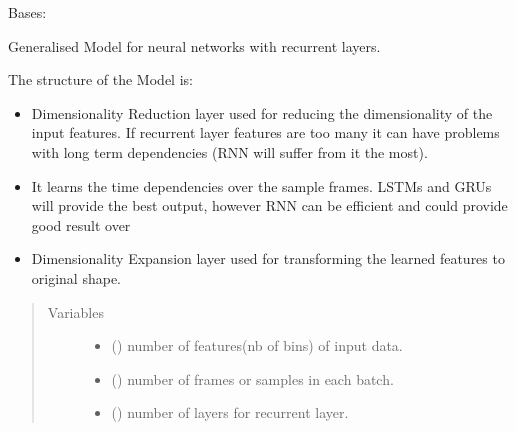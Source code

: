 \documentclass[letterpaper,10pt,english]{sphinxmanual}
\begin{document}
\begin{fulllineitems}
\label{\detokenize{docs/source/train:train.model.Generalised_Recurrent_Model}}
Bases: 

Generalised Model for neural networks with recurrent layers.

The structure of the Model is:
\begin{itemize}
\item {} 
 Dimensionality Reduction layer used for reducing the dimensionality of the input features. If recurrent layer features are too many it can have problems with long term dependencies (RNN will suffer from it the most).

\item {} 
 It learns the time dependencies over the sample frames. LSTMs and GRUs will provide the best output, however RNN can be efficient and could provide good result over

\item {} 
 Dimensionality Expansion layer used for transforming the learned features to original shape.

\end{itemize}
\begin{quote}\begin{description}
\item[{Variables}] \leavevmode\begin{itemize}
\item {} 
 () \textendash{} number of features(nb of bins) of input data.

\item {} 
 () \textendash{} number of frames or samples in each batch.

\item {} 
 () \textendash{} number of layers for recurrent layer.


\end{itemize}
\end{description}
\end{quote}
\end{fulllineitems}
\end{document}

